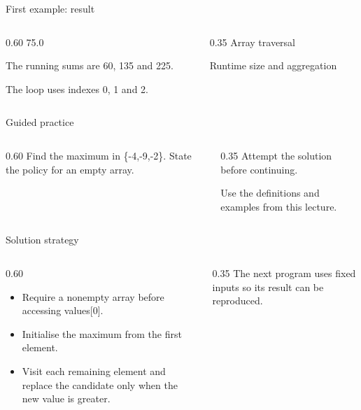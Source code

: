 \documentclass[10pt,aspectratio=169]{beamer}
\begin{document}
\begin{frame}[fragile,t]{First example: result}
\begin{columns}[T,onlytextwidth]\begin{column}{0.60\textwidth}
75.0\par The running sums are 60, 135 and 225.\par The loop uses indexes 0, 1 and 2.
\end{column}\begin{column}{0.35\textwidth}\small
Array traversal

Runtime size and aggregation
\end{column}\end{columns}
\end{frame}

\begin{frame}[fragile,t]{Guided practice}
\begin{columns}[T,onlytextwidth]\begin{column}{0.60\textwidth}
Find the maximum in \{-4,-9,-2\}. State the policy for an empty array.
\end{column}\begin{column}{0.35\textwidth}\small
Attempt the solution before continuing.

Use the definitions and examples from this lecture.
\end{column}\end{columns}
\end{frame}

\begin{frame}[fragile,t]{Solution strategy}
\begin{columns}[T,onlytextwidth]\begin{column}{0.60\textwidth}
\begin{itemize}
\item Require a nonempty array before accessing values[0].
\item Initialise the maximum from the first element.
\item Visit each remaining element and replace the candidate only when the new value is greater.
\end{itemize}
\end{column}\begin{column}{0.35\textwidth}\small
The next program uses fixed inputs so its result can be reproduced.
\end{column}\end{columns}
\end{frame}
\end{document}
